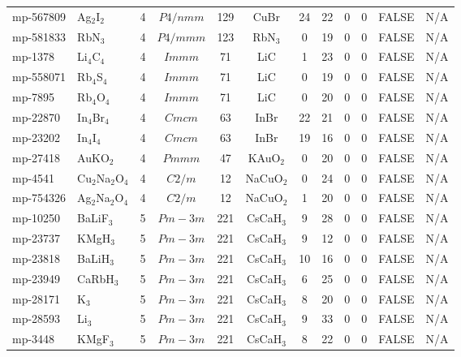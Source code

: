 {\begin{longtable}{llcccccccccc}
    mp-567809 & Ag$_{2}$I$_{2}$ & 4     & $P4/nmm$ & 129   & CuBr  & 24    & 22    & 0     & 0     & FALSE & N/A \\
    mp-581833 & RbN$_{3}$ & 4     & $P4/mmm$ & 123   & RbN$_{3}$ & 0     & 19    & 0     & 0     & FALSE & N/A \\
    mp-1378 & Li$_{4}$C$_{4}$ & 4     & $Immm$ & 71    & LiC   & 1     & 23    & 0     & 0     & FALSE & N/A \\
    mp-558071 & Rb$_{4}$S$_{4}$ & 4     & $Immm$ & 71    & LiC   & 0     & 19    & 0     & 0     & FALSE & N/A \\
    mp-7895 & Rb$_{4}$O$_{4}$ & 4     & $Immm$ & 71    & LiC   & 0     & 20    & 0     & 0     & FALSE & N/A \\
    mp-22870 & In$_{4}$Br$_{4}$ & 4     & $Cmcm$ & 63    & InBr  & 22    & 21    & 0     & 0     & FALSE & N/A \\
    mp-23202 & In$_{4}$I$_{4}$ & 4     & $Cmcm$ & 63    & InBr  & 19    & 16    & 0     & 0     & FALSE & N/A \\
    mp-27418 & AuKO$_{2}$ & 4     & $Pmmm$ & 47    & KAuO$_{2}$ & 0     & 20    & 0     & 0     & FALSE & N/A \\
    mp-4541 & Cu$_{2}$Na$_{2}$O$_{4}$ & 4     & $C2/m$ & 12    & NaCuO$_{2}$ & 0     & 24    & 0     & 0     & FALSE & N/A \\
    mp-754326 & Ag$_{2}$Na$_{2}$O$_{4}$ & 4     & $C2/m$ & 12    & NaCuO$_{2}$ & 1     & 20    & 0     & 0     & FALSE & N/A \\
    mp-10250 & BaLiF$_{3}$ & 5     & $Pm-3m$ & 221   & CsCaH$_{3}$ & 9     & 28    & 0     & 0     & FALSE & N/A \\
    mp-23737 & KMgH$_{3}$ & 5     & $Pm-3m$ & 221   & CsCaH$_{3}$ & 9     & 12    & 0     & 0     & FALSE & N/A \\
    mp-23818 & BaLiH$_{3}$ & 5     & $Pm-3m$ & 221   & CsCaH$_{3}$ & 10    & 16    & 0     & 0     & FALSE & N/A \\
    mp-23949 & CaRbH$_{3}$ & 5     & $Pm-3m$ & 221   & CsCaH$_{3}$ & 6     & 25    & 0     & 0     & FALSE & N/A \\
    mp-28171 & K$_{3}$ & 5     & $Pm-3m$ & 221   & CsCaH$_{3}$ & 8     & 20    & 0     & 0     & FALSE & N/A \\
    mp-28593 & Li$_{3}$ & 5     & $Pm-3m$ & 221   & CsCaH$_{3}$ & 9     & 33    & 0     & 0     & FALSE & N/A \\
    mp-3448 & KMgF$_{3}$ & 5     & $Pm-3m$ & 221   & CsCaH$_{3}$ & 8     & 22    & 0     & 0     & FALSE & N/A \\

\end{longtable}}
